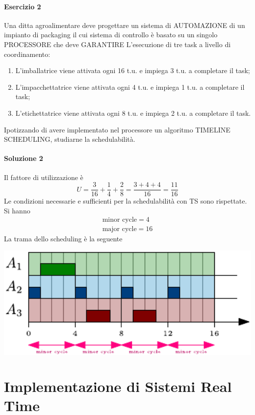 \documentclass[10pt, letterpaper]{report}
\begin{document}
\subsubsection{Esercizio 2}
Una ditta agroalimentare deve progettare un sistema di AUTOMAZIONE di un impianto di
packaging il cui sistema di controllo è basato su un singolo PROCESSORE che deve
GARANTIRE L'esecuzione di tre task a livello di coordinamento:\begin{enumerate}
    \item L'imballatrice viene attivata ogni 16 t.u. e impiega 3 t.u. a completare il task;
    \item L'impacchettatrice viene attivata ogni 4 t.u. e impiega 1 t.u. a completare il task;
    \item L'etichettatrice viene attivata ogni 8 t.u. e impiega 2 t.u. a completare il task.
\end{enumerate}
Ipotizzando di avere implementato nel processore un algoritmo TIMELINE
SCHEDULING, studiarne la schedulabilità.\subsubsection{Soluzione 2}
Il fattore di utilizzazione è 
$$U=\frac{3}{16}+\frac{1}{4}+\frac{2}{8}=\frac{3+4+4}{16}=\frac{11}{16} $$
Le condizioni necessarie e sufficienti per la schedulabilità con TS sono rispettate. Si hanno 
$$\begin{matrix}
    \text{minor cycle} = 4\\ 
    \text{major cycle} = 16
\end{matrix} $$
La trama dello scheduling è la seguente\begin{center}
    \includegraphics[width=1\textwidth ]{images/esercizioEsame2.pdf}
\end{center}
\chapter{Implementazione di Sistemi Real Time}
\end{document}
